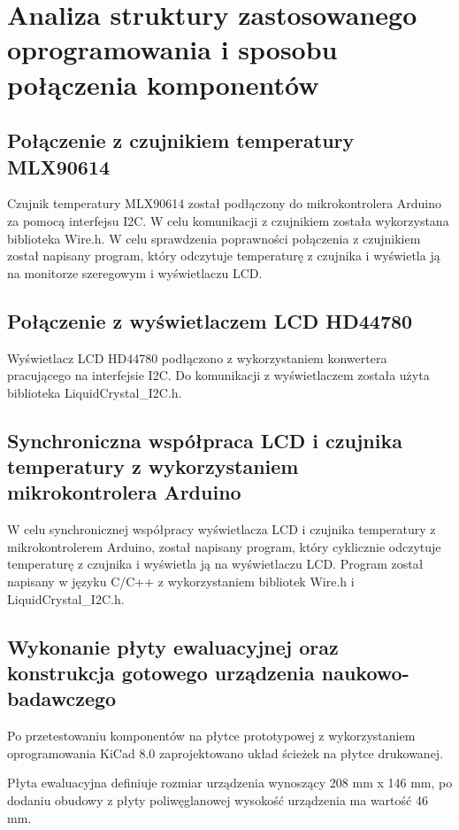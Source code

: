 \chapter{Analiza struktury zastosowanego oprogramowania i sposobu połączenia komponentów}
\section{Połączenie z czujnikiem temperatury MLX90614}

Czujnik temperatury MLX90614 został podłączony do mikrokontrolera Arduino za pomocą interfejsu I2C. W celu komunikacji z czujnikiem została wykorzystana biblioteka Wire.h. W celu sprawdzenia poprawności połączenia z czujnikiem został napisany program, który odczytuje temperaturę z czujnika i wyświetla ją na monitorze szeregowym i wyświetlaczu LCD. 

\section{Połączenie z wyświetlaczem LCD HD44780}

Wyświetlacz LCD HD44780 podłączono z wykorzystaniem konwertera pracującego na interfejsie I2C. Do komunikacji z wyświetlaczem została użyta biblioteka LiquidCrystal\_I2C.h.

\section{Synchroniczna współpraca LCD i czujnika temperatury z wykorzystaniem mikrokontrolera Arduino}

W celu synchronicznej współpracy wyświetlacza LCD i czujnika temperatury z mikrokontrolerem Arduino, został napisany program, który cyklicznie odczytuje temperaturę z czujnika i wyświetla ją na wyświetlaczu LCD. Program został napisany w języku C/C++ z wykorzystaniem bibliotek Wire.h i LiquidCrystal\_I2C.h.

\section{Wykonanie płyty ewaluacyjnej oraz konstrukcja gotowego urządzenia naukowo-badawczego}

Po przetestowaniu komponentów na płytce prototypowej z wykorzystaniem oprogramowania KiCad 8.0 zaprojektowano układ ścieżek na płytce drukowanej.

\vspace{12pt}

Płyta ewaluacyjna definiuje rozmiar urządzenia wynoszący 208 mm x 146 mm, po dodaniu obudowy z płyty poliwęglanowej wysokość urządzenia ma wartość 46 mm.

